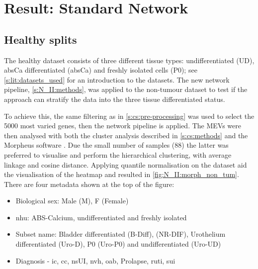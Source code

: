 \section{Result: Standard Network}  \label{s:N_II:std_net}

\vspace{3mm}
\vspace{3mm}

\subsection{Healthy splits} \label{s:N_II:std}

The healthy dataset consists of three different tissue types: undifferentiated (UD), \acrshort{absCa} differentiated (\acrshort{absCa}) and freshly isolated cells (P0); see \cref{s:lit:datasets_used} for an introduction to the datasets. The new network pipeline, \cref{s:N_II:methods}, was applied to the non-tumour dataset to test if the approach can stratify the data into the three tissue differentiated status.

To achieve this, the same filtering as in \cref{s:cs:pre-processing} was used to select the 5000 most varied genes, then the network pipeline is applied. The MEVs were then analysed with both the cluster analysis described in \cref{s:cs:methods} and the Morpheus software \citep{Broad-InstituteUnknown-kn}. Due the small number of samples (88) the latter was preferred to visualise and perform the hierarchical clustering, with average linkage and cosine distance. Applying quantile normalisation on the dataset aid the visualisation of the heatmap and resulted in \cref{fig:N_II:morph_non_tum}. There are four metadata shown at the top of the figure: 
\begin{itemize}
    \item Biological sex: Male (M), F (Female)
    \item \acrfull{nhu}: ABS-Calcium, undifferentiated and freshly isolated
    \item Subset name: Bladder differentiated (B-Diff), (NR-DIF), Urothelium differentiated (Uro-D), P0 (Uro-P0) and undifferentiated (Uro-UD)
    \item Diagnosis - \acrfull{ic}, \acrfull{cc}, \acrfull{nsUI},  \acrfull{nvh}, \acrfull{oab}, Prolapse, \acrfull{ruti}, \acrfull{sui}
\end{itemize} 

